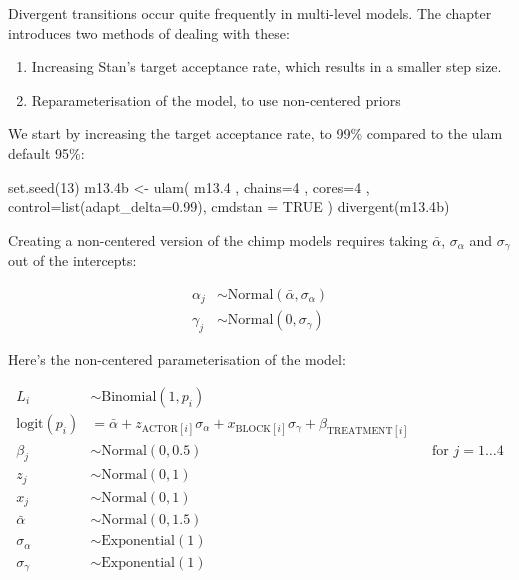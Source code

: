 \documentclass[
]{book}
\newenvironment{Shaded}{\begin{snugshade}}{\end{snugshade}}
\newcommand{\AttributeTok}[1]{\textcolor[rgb]{0.77,0.63,0.00}{#1}}
\newcommand{\ConstantTok}[1]{\textcolor[rgb]{0.00,0.00,0.00}{#1}}
\newcommand{\DecValTok}[1]{\textcolor[rgb]{0.00,0.00,0.81}{#1}}
\newcommand{\FloatTok}[1]{\textcolor[rgb]{0.00,0.00,0.81}{#1}}
\newcommand{\FunctionTok}[1]{\textcolor[rgb]{0.00,0.00,0.00}{#1}}
\newcommand{\NormalTok}[1]{#1}
\newcommand{\OtherTok}[1]{\textcolor[rgb]{0.56,0.35,0.01}{#1}}
\providecommand{\tightlist}{%
  \setlength{\itemsep}{0pt}\setlength{\parskip}{0pt}}
\begin{document}
Divergent transitions occur quite frequently in multi-level models. The chapter introduces two methods of dealing with these:

\begin{enumerate}
\def\labelenumi{\arabic{enumi}.}
\tightlist
\item
  Increasing Stan's target acceptance rate, which results in a smaller step size.
\item
  Reparameterisation of the model, to use non-centered priors
\end{enumerate}

We start by increasing the target acceptance rate, to 99\% compared to the ulam default 95\%:

\begin{Shaded}
\begin{Highlighting}[]
\FunctionTok{set.seed}\NormalTok{(}\DecValTok{13}\NormalTok{) }
\NormalTok{m13}\FloatTok{.4}\NormalTok{b }\OtherTok{\textless{}{-}} \FunctionTok{ulam}\NormalTok{( m13}\FloatTok{.4}\NormalTok{ , }\AttributeTok{chains=}\DecValTok{4}\NormalTok{ , }\AttributeTok{cores=}\DecValTok{4}\NormalTok{ , }\AttributeTok{control=}\FunctionTok{list}\NormalTok{(}\AttributeTok{adapt\_delta=}\FloatTok{0.99}\NormalTok{), }\AttributeTok{cmdstan =} \ConstantTok{TRUE}\NormalTok{ )}
\FunctionTok{divergent}\NormalTok{(m13}\FloatTok{.4}\NormalTok{b)}
\end{Highlighting}
\end{Shaded}

Creating a non-centered version of the chimp models requires taking \(\bar{\alpha}\), \(\sigma_\alpha\) and \(\sigma_\gamma\) out of the intercepts:

\[
\begin{aligned}
\alpha_j &\sim \text{Normal}(\bar{\alpha},\sigma_\alpha)\\
\gamma_j &\sim \text{Normal}(0,\sigma_\gamma)
\end{aligned}
\]

Here's the non-centered parameterisation of the model:

\[
\begin{aligned}
L_i &\sim \text{Binomial}(1,p_i) \\
\text{logit}(p_i) &= \bar{\alpha} +  z_{\text{ACTOR}[i]} \sigma_\alpha + x_{\text{BLOCK}[i]} \sigma_\gamma + \beta_{\text{TREATMENT}[i]} \\
\beta_j &\sim \text{Normal}(0,0.5) && \text{for } j = 1 \dots 4 \\
z_j &\sim \text{Normal}(0,1)  \\
x_j &\sim \text{Normal}(0,1) \\
\bar{\alpha} & \sim \text{Normal}(0,1.5) \\
\sigma_\alpha &\sim \text{Exponential}(1) \\
\sigma_\gamma &\sim \text{Exponential}(1)
\end{aligned}
\]
\end{document}
